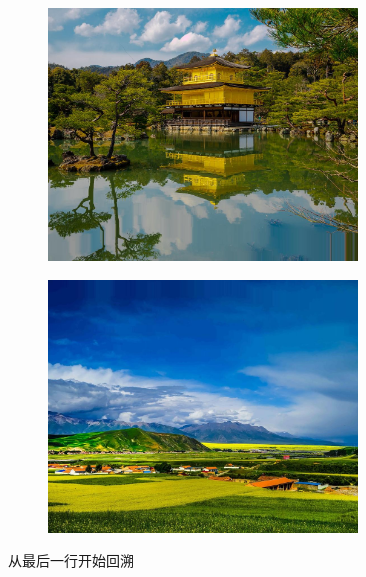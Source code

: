 \documentclass[12pt]{article}
\begin{document}
		\begin{figure}[htbp]
			\centering
			\begin{subfigure}{0.33\linewidth}
				\centering
				\includegraphics[width=0.9\textwidth]{figure/pic1_result_back.jpg}
			\end{subfigure}
			\begin{subfigure}{0.33\linewidth}
				\centering
				\includegraphics[width=0.9\textwidth]{figure/pic2_result_back.jpg}
			\end{subfigure}
			\caption{从最后一行开始回溯}
		\end{figure}
\end{document}

